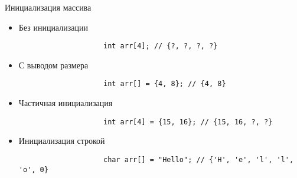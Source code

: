 \documentclass[aspectratio=169,14pt]{beamer}
\begin{document}
    \begin{frame}[fragile]{Инициализация массива}
        \begin{itemize}
            \item<1-> Без инициализации
                \begin{verbatim}
                    int arr[4]; // {?, ?, ?, ?}
                \end{verbatim}
            \item<2-> С выводом размера
                \begin{verbatim}
                    int arr[] = {4, 8}; // {4, 8}
                \end{verbatim}
            \item<3-> Частичная инициализация
                \begin{verbatim}
                    int arr[4] = {15, 16}; // {15, 16, ?, ?}
                \end{verbatim}
            \item<4-> Инициализация строкой
                \begin{verbatim}
                    char arr[] = "Hello"; // {'H', 'e', 'l', 'l', 'o', 0}
                \end{verbatim}
        \end{itemize}
    \end{frame}
\end{document}
